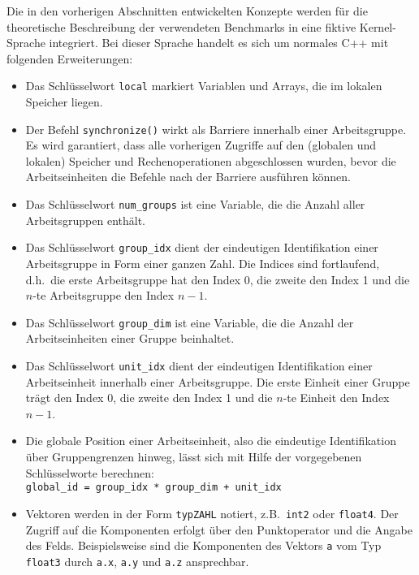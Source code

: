 Die in den vorherigen Abschnitten entwickelten Konzepte werden für die
theoretische Beschreibung der verwendeten Benchmarks in eine fiktive
Kernel-Sprache integriert. Bei dieser Sprache handelt es sich um normales C++
mit folgenden Erweiterungen:

\begin{itemize}
    \item Das Schlüsselwort \texttt{local} markiert Variablen und Arrays, die im
          lokalen Speicher liegen.
    \item Der Befehl \texttt{synchronize()} wirkt als Barriere innerhalb einer
          Arbeitsgruppe. Es wird garantiert, dass alle vorherigen Zugriffe auf
          den (globalen und lokalen) Speicher und Rechenoperationen
          abgeschlossen wurden, bevor die Arbeitseinheiten die Befehle nach der
          Barriere ausführen können.
    \item Das Schlüsselwort \texttt{num\_groups} ist eine Variable, die die
          Anzahl aller Arbeitsgruppen enthält.
    \item Das Schlüsselwort \texttt{group\_idx} dient der eindeutigen
          Identifikation einer Arbeitsgruppe in Form einer ganzen Zahl. Die
          Indices sind fortlaufend, d.h.\ die erste Arbeitsgruppe hat den
          Index 0, die zweite den Index 1 und die $n$-te Arbeitsgruppe den
          Index $n - 1$.
    \item Das Schlüsselwort \texttt{group\_dim} ist eine Variable, die die
          Anzahl der Arbeitseinheiten einer Gruppe beinhaltet.
    \item Das Schlüsselwort \texttt{unit\_idx} dient der eindeutigen
          Identifikation einer Arbeitseinheit innerhalb einer Arbeitsgruppe. Die
          erste Einheit einer Gruppe trägt den Index 0, die zweite den Index 1
          und die $n$-te Einheit den Index $n - 1$.
    \item Die globale Position einer Arbeitseinheit, also die eindeutige
          Identifikation über Gruppengrenzen hinweg, lässt sich mit Hilfe der
          vorgegebenen Schlüsselworte berechnen:\\
          \texttt{global\_id = group\_idx * group\_dim + unit\_idx}
    \item Vektoren werden in der Form \texttt{typZAHL} notiert, z.B.\
          \texttt{int2} oder \texttt{float4}. Der Zugriff auf die Komponenten
          erfolgt über den Punktoperator und die Angabe des Felds.
          Beispielsweise sind die Komponenten des Vektors \texttt{a} vom Typ
          \texttt{float3} durch \texttt{a.x}, \texttt{a.y} und \texttt{a.z}
          ansprechbar.
\end{itemize}

